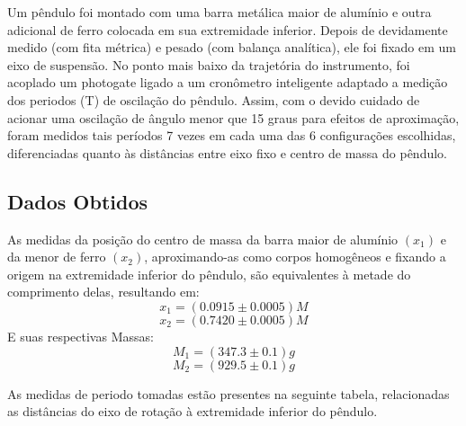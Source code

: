 \documentclass[12pt,a4paper]{article}
\begin{document}
Um pêndulo foi montado com uma barra metálica maior de alumínio e outra adicional de ferro colocada em sua extremidade inferior. Depois de devidamente medido (com fita métrica) e pesado (com balança analítica), ele foi fixado em um eixo de suspensão. No ponto mais baixo da trajetória do instrumento, foi acoplado um photogate ligado a um cronômetro inteligente adaptado a medição dos periodos (T) de oscilação do pêndulo. Assim, com o devido cuidado de acionar uma oscilação de ângulo menor que 15 graus para efeitos de aproximação, foram medidos tais períodos 7 vezes em cada uma das 6 configurações escolhidas, diferenciadas quanto às distâncias entre eixo fixo e centro de massa do pêndulo.\\

\subsection{Dados Obtidos}

As medidas da posição do centro de massa da barra maior de alumínio $(x_1)$ e da menor de ferro $(x_2)$, aproximando-as como corpos homogêneos e fixando a origem na extremidade inferior do pêndulo, são equivalentes à metade do comprimento delas, resultando em: \\
$$ x_1 = (0.0915 \pm 0.0005) M$$
$$ x_2 = (0.7420 \pm 0.0005) M$$
E suas respectivas Massas:\\
$$ M_1 = (347.3 \pm 0.1) g $$
$$ M_2 = (929.5 \pm 0.1) g $$


As medidas de periodo tomadas estão presentes na seguinte tabela, relacionadas as distâncias do eixo de rotação à extremidade inferior do pêndulo. \\
\end{document}

